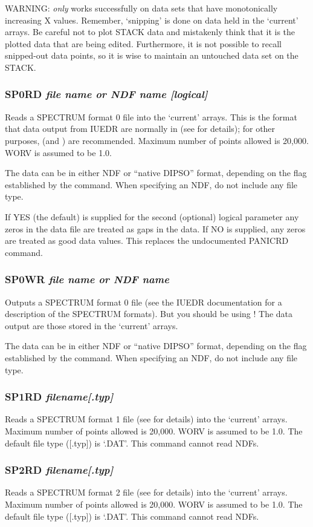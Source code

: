 \documentclass[twoside,11pt,noabs,nolof]{starlink}
\providecommand{\dipcom}[3]{\subsubsection*{\label{COM:#1}\xlabel{COM:#1}\textbf{#1} \emph{#2}}}
\begin{document}
WARNING:   \emph{only} works successfully on data sets that have
monotonically increasing X values. Remember, `snipping' is done on
data held in the `current' arrays. Be careful not to plot STACK data
and mistakenly think that it is the plotted data that are being
edited. Furthermore, it is not possible to recall snipped-out data
points, so it is wise to maintain an untouched data set on the STACK.

\dipcom{SP0RD}{file name or NDF name [logical]}{Reads an IUE SPECTRUM format 0 file into the current arrays}
Reads a SPECTRUM format 0 file into the `current' arrays. This is the
format that data output from IUEDR are normally in (see
 for
details); for other purposes,   (and )  are recommended.
Maximum number of points allowed is 20,000. WORV is assumed to be 1.0.

The data can be in either NDF or ``native DIPSO'' format, depending
on the flag established by the   command. When specifying an NDF, do
not include any file type.

If YES (the default) is supplied for the second (optional) logical
parameter any zeros in the data file are treated as gaps in the data. If
NO is supplied, any zeros are treated as good data values. This replaces
the undocumented PANICRD command.


\dipcom{SP0WR}{file name or NDF name}{Writes the current arrays to an IUE SPECTRUM format 0 file}
Outputs a SPECTRUM format 0 file (see the IUEDR documentation
for a description of the SPECTRUM formats). But you should be using
!  The data output are those stored in the `current' arrays.

The data can be in either NDF or ``native DIPSO'' format, depending on the flag
established by the   command. When specifying an NDF, do not include
any file type.

\dipcom{SP1RD}{filename[.typ]}{Reads an IUE SPECTRUM format 1 file into the current arrays}
Reads a SPECTRUM format 1 file (see  for details) into the
`current' arrays. Maximum number of points allowed is 20,000. WORV is
assumed to be 1.0. The default file type ([.typ]) is `.DAT'. This command
cannot read NDFs.

\dipcom{SP2RD}{filename[.typ]}{Reads an IUE SPECTRUM format 2 file into the current arrays}
Reads a SPECTRUM format 2 file (see  for details) into the
`current' arrays. Maximum number of points allowed is 20,000. WORV is
assumed to be 1.0. The default file type ([.typ]) is `.DAT'. This command
cannot read NDFs.
\end{document}
